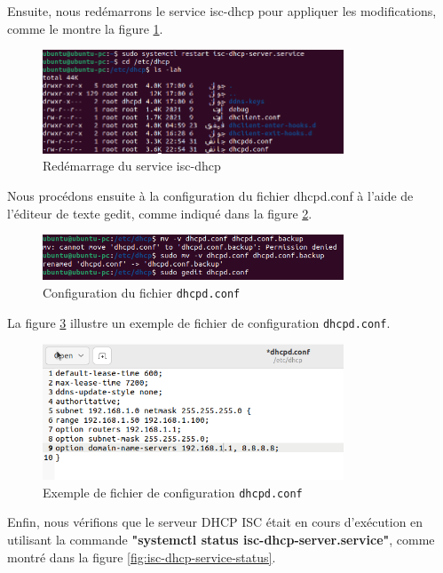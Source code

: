 Ensuite, nous redémarrons le service isc-dhcp pour appliquer les modifications, comme le montre la figure \ref{fig:restart-isc-dhcp}.

\begin{figure}[H]
    \centering
    \includegraphics[width=0.8\textwidth]{Images/dhcp2.png}
    \caption{Redémarrage du service isc-dhcp}
    \label{fig:restart-isc-dhcp}
\end{figure}

Nous procédons ensuite à la configuration du fichier dhcpd.conf à l'aide de l'éditeur de texte gedit, comme indiqué dans la figure \ref{fig:dhcpd-conf-configuration}.

\begin{figure}[H]
    \centering
    \includegraphics[width=0.8\textwidth]{Images/dhcp3.png}
    \caption{Configuration du fichier \texttt{dhcpd.conf}}
    \label{fig:dhcpd-conf-configuration}
\end{figure}

La figure  \ref{fig:dhcpd-conf-example} illustre un exemple de fichier de configuration \texttt{dhcpd.conf}.

\begin{figure}[H]
    \centering
    \includegraphics[width=0.8\textwidth]{Images/dhcp4.png}
    \caption{Exemple de fichier de configuration \texttt{dhcpd.conf}}
    \label{fig:dhcpd-conf-example}
\end{figure}

Enfin, nous vérifions que le serveur DHCP ISC était en cours d'exécution en utilisant la commande \textbf{"systemctl status isc-dhcp-server.service"}, comme montré dans la figure \ref{fig:isc-dhcp-service-status}.

